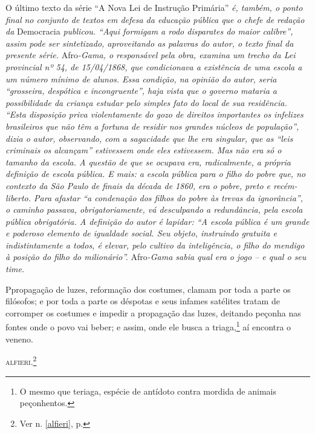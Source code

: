 \begin{didascalia}
O último texto da série ``A Nova Lei de Instrução Primária'' \emph{é,
também, o ponto final no conjunto de textos em defesa da educação
pública que o chefe de redação da} Democracia \emph{publicou. ``Aqui
formigam a rodo disparates do maior calibre'', assim pode ser
sintetizado, aproveitando as palavras do autor, o texto final da
presente série.} Afro\emph{-Gama, o responsável pela obra, examina um
trecho da Lei provincial nº 54, de 15/04/1868, que condicionava a
existência de uma escola a um número mínimo de alunos. Essa condição, na
opinião do autor, seria ``grosseira, despótica e incongruente'', haja
vista que o governo mataria a possibilidade da criança estudar pelo
simples fato do local de sua residência. ``Esta disposição priva
violentamente do gozo de direitos importantes os infelizes brasileiros
que não têm a fortuna de residir nos grandes núcleos de população'',
dizia o autor, observando, com a sagacidade que lhe era singular, que as
``leis criminais os alcançam'' estivessem onde eles estivessem. Mas não
era só o tamanho da escola. A questão de que se ocupava era,
radicalmente, a própria definição de escola pública. E mais: a escola
pública para o filho do pobre que, no contexto da São Paulo de finais da
década de 1860, era o pobre, preto e recém-liberto. Para afastar ``a
condenação dos filhos do pobre às trevas da ignorância'', o caminho
passava, obrigatoriamente, vá desculpando a redundância, pela escola
pública obrigatória. A definição do autor é lapidar: ``A escola pública é
um grande e poderoso elemento de igualdade social. Seu objeto,
instruindo gratuita e indistintamente a todos, é elevar, pelo cultivo da
inteligência, o filho do mendigo à posição do filho do milionário''.}
Afro\emph{-Gama sabia qual era o jogo -- e qual o seu time.}
\end{didascalia}



Ppropagação de luzes, reformação dos costumes, clamam por toda a parte os
filósofos; e por toda a parte os déspotas e seus infames satélites
tratam de corromper os costumes e impedir a propagação das luzes,
deitando peçonha nas fontes onde o povo vai beber; e assim, onde ele
busca a triaga,\footnote{O mesmo que teriaga, espécie de antídoto
  contra mordida de animais peçonhentos.} aí encontra o veneno.

\textsc{alfieri}.\footnote{Ver n. \ref{alfieri}, p. \pageref{alfieri}}

